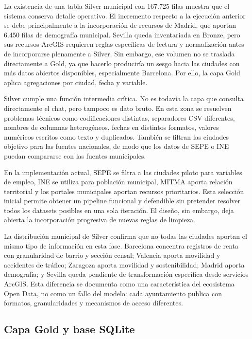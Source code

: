 La existencia de una tabla Silver municipal con 167.725 filas muestra que el sistema conserva detalle operativo. El incremento respecto a la ejecución anterior se debe principalmente a la incorporación de recursos de Madrid, que aportan 6.450 filas de demografía municipal. Sevilla queda inventariada en Bronze, pero sus recursos ArcGIS requieren reglas específicas de lectura y normalización antes de incorporarse plenamente a Silver. Sin embargo, ese volumen no se traslada directamente a Gold, ya que hacerlo produciría un sesgo hacia las ciudades con más datos abiertos disponibles, especialmente Barcelona. Por ello, la capa Gold aplica agregaciones por ciudad, fecha y variable.

Silver cumple una función intermedia crítica. No es todavía la capa que consulta directamente el chat, pero tampoco es dato bruto. En esta zona se resuelven problemas técnicos como codificaciones distintas, separadores CSV diferentes, nombres de columnas heterogéneos, fechas en distintos formatos, valores numéricos escritos como texto y duplicados. También se filtran las ciudades objetivo para las fuentes nacionales, de modo que los datos de SEPE o INE puedan compararse con las fuentes municipales.

En la implementación actual, SEPE se filtra a las ciudades piloto para variables de empleo, INE se utiliza para población municipal, MITMA aporta relación territorial y los portales municipales aportan recursos prioritarios. Esta selección inicial permite obtener un pipeline funcional y defendible sin pretender resolver todos los datasets posibles en una sola iteración. El diseño, sin embargo, deja abierta la incorporación progresiva de nuevas reglas de limpieza.

La distribución municipal de Silver confirma que no todas las ciudades aportan el mismo tipo de información en esta fase. Barcelona concentra registros de renta con granularidad de barrio y sección censal; Valencia aporta movilidad y accidentes de tráfico; Zaragoza aporta movilidad y sostenibilidad; Madrid aporta demografía; y Sevilla queda pendiente de transformación específica desde servicios ArcGIS. Esta diferencia se documenta como una característica del ecosistema Open Data, no como un fallo del modelo: cada ayuntamiento publica con formatos, granularidades y mecanismos de acceso diferentes.

\subsection{Capa Gold y base SQLite}

